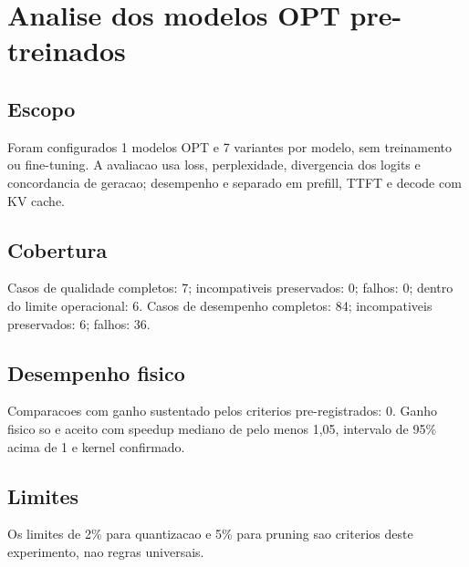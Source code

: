 \chapter{Analise dos modelos OPT pre-treinados}
\section{Escopo}
Foram configurados 1 modelos OPT e 7 variantes por modelo, sem treinamento ou fine-tuning.
A avaliacao usa loss, perplexidade, divergencia dos logits e concordancia de geracao; desempenho e separado em prefill, TTFT e decode com KV cache.
\section{Cobertura}
Casos de qualidade completos: 7; incompativeis preservados: 0; falhos: 0; dentro do limite operacional: 6.
Casos de desempenho completos: 84; incompativeis preservados: 6; falhos: 36.
\section{Desempenho fisico}
Comparacoes com ganho sustentado pelos criterios pre-registrados: 0.
Ganho fisico so e aceito com speedup mediano de pelo menos 1,05, intervalo de 95\% acima de 1 e kernel confirmado.
\section{Limites}
Os limites de 2\% para quantizacao e 5\% para pruning sao criterios deste experimento, nao regras universais.
